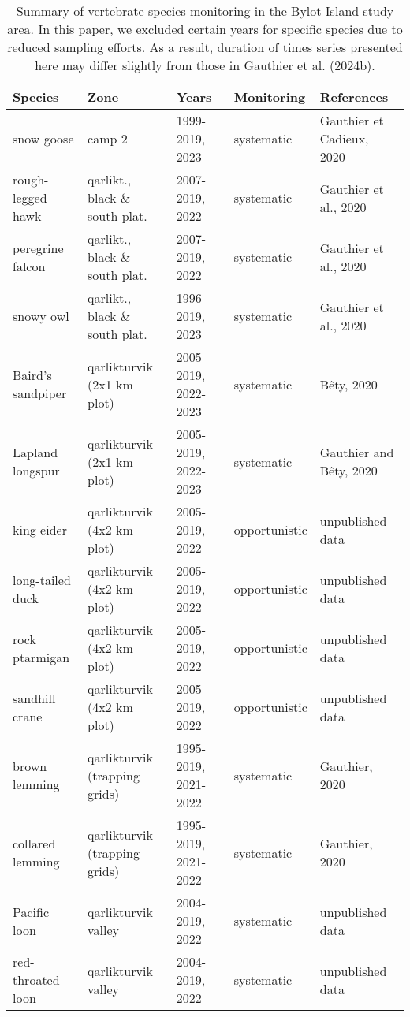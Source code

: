 \begin{table}[ht]
\centering
\caption{Summary of vertebrate species monitoring in the Bylot Island study area. In this paper, we excluded certain years for specific species due to reduced sampling efforts. As a result, duration of times series presented here may differ slightly from those in Gauthier et al. (2024b).} 
\label{table:species_year_monitoring}
\begingroup\fontsize{8pt}{10pt}\selectfont
\begin{tabularx}{\textwidth}{lllll}
  \hline
Species & Zone & Years & Monitoring & References \\ 
  \hline
snow goose & camp 2 & 1999-2019, 2023 & systematic & Gauthier et Cadieux, 2020 \\ 
  rough-legged hawk & qarlikt., black \& south plat. & 2007-2019, 2022 & systematic & Gauthier et al., 2020 \\ 
  peregrine falcon & qarlikt., black \& south plat. & 2007-2019, 2022 & systematic & Gauthier et al., 2020 \\ 
  snowy owl & qarlikt., black \& south plat. & 1996-2019, 2023 & systematic & Gauthier et al., 2020 \\ 
  Baird's sandpiper & qarlikturvik (2x1 km plot) & 2005-2019, 2022-2023 & systematic & Bêty, 2020 \\ 
  Lapland longspur & qarlikturvik (2x1 km plot) & 2005-2019, 2022-2023 & systematic & Gauthier and Bêty, 2020 \\ 
  king eider & qarlikturvik (4x2 km plot) & 2005-2019, 2022 & opportunistic & unpublished data \\ 
  long-tailed duck & qarlikturvik (4x2 km plot) & 2005-2019, 2022 & opportunistic & unpublished data \\ 
  rock ptarmigan & qarlikturvik (4x2 km plot) & 2005-2019, 2022 & opportunistic & unpublished data \\ 
  sandhill crane & qarlikturvik (4x2 km plot) & 2005-2019, 2022 & opportunistic & unpublished data \\ 
  brown lemming & qarlikturvik (trapping grids) & 1995-2019, 2021-2022 & systematic & Gauthier, 2020 \\ 
  collared lemming & qarlikturvik (trapping grids) & 1995-2019, 2021-2022 & systematic & Gauthier, 2020 \\ 
  Pacific loon & qarlikturvik valley & 2004-2019, 2022 & systematic & unpublished data \\ 
  red-throated loon & qarlikturvik valley & 2004-2019, 2022 & systematic & unpublished data \\ 

\end{tabularx}
\end{table}
